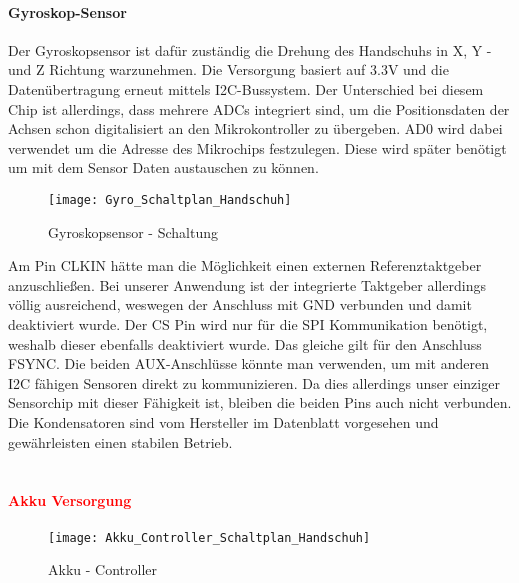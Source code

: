 \documentclass[titlepage,12pt,twoside]{article}
\begin{document}
\paragraph{Gyroskop-Sensor}
\hfill \break
\hfill \break
Der Gyroskopsensor ist dafür zuständig die Drehung des Handschuhs in X, Y -und Z Richtung warzunehmen. Die Versorgung basiert 
auf 3.3V und die Datenübertragung erneut mittels I2C-Bussystem. Der Unterschied bei diesem Chip ist allerdings, dass mehrere ADCs
integriert sind, um die Positionsdaten der Achsen schon digitalisiert an den Mikrokontroller zu übergeben. AD0 wird dabei verwendet
um die Adresse des Mikrochips festzulegen. Diese wird später benötigt um mit dem Sensor Daten austauschen zu können.
\\
\begin{figure}[H]
	\begin{center}
		\scalebox{0.5}
		{\texttt{[image: Gyro\_Schaltplan\_Handschuh]}}
		\caption{Gyroskopsensor - Schaltung}
		\label{fig:Gyro_Schaltplan_Handschuh}		
	\end{center}
\end{figure}
\hfill \break
Am Pin CLKIN hätte man die Möglichkeit einen externen Referenztaktgeber anzuschließen. Bei unserer Anwendung ist der integrierte 
Taktgeber allerdings völlig ausreichend, weswegen der Anschluss mit GND verbunden und damit deaktiviert wurde. Der CS Pin wird nur
für die SPI Kommunikation benötigt, weshalb dieser ebenfalls deaktiviert wurde. Das gleiche gilt für den Anschluss FSYNC. Die beiden
AUX-Anschlüsse könnte man verwenden, um mit anderen I2C fähigen Sensoren direkt zu kommunizieren. Da dies allerdings unser einziger
Sensorchip mit dieser Fähigkeit ist, bleiben die beiden Pins auch nicht verbunden. Die Kondensatoren sind vom Hersteller im Datenblatt
vorgesehen und gewährleisten einen stabilen Betrieb. \\
\\
\paragraph{\textcolor{red}{Akku Versorgung}}
\hfill \break
\hfill \break
\begin{figure}[H]
	\begin{center}
		\scalebox{0.5}
		{\texttt{[image: Akku\_Controller\_Schaltplan\_Handschuh]}}
		\caption{Akku - Controller}
		\label{fig:Akku_Controller_Schaltplan_Handschuh}	
	\end{center}
\end{figure}
\end{document}
